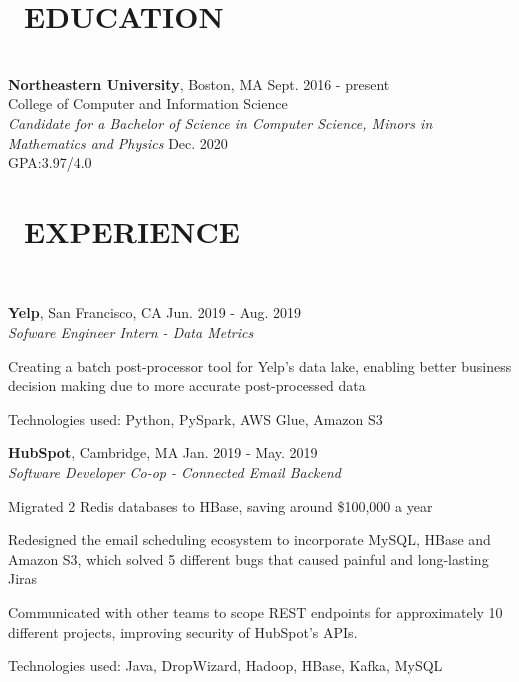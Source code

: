 \documentclass[11pt]{res}
\newcommand{\sectionunderline}{\vspace{-3mm}\hrulefill\\}
\newcommand{\listingtab}{\tabto{3.5cm}}
\newcommand{\newsect}[1]{\section{\Large \bf #1}}
\newcommand{\email}[1]{\faEnvelope\hspace{1mm} \href{mailto:#1}{#1}}
\newcommand{\phone}[1]{\faMobilePhone\hspace{1mm} #1}
\newcommand{\github}[1]{\faGithubAlt\hspace{1mm} \href{https://github.com/#1}{#1}}
\newcommand{\linkedin}[1]{\faLinkedinSquare\hspace{1mm} \href{https://linkedin.com/in/#1}{#1}}
\begin{document}
\address{
  \large\phone{(802) 503-5089}\:
  \large{$\bullet$}
  \large\email{derekpham67@gmail.com}\:
  \large{$\bullet$}
  \large\github{derekpham}\:
  \large{$\bullet$}
  \large\linkedin{derek-pham97}\\
  \normalsize Availability for internships/co-ops: Jan. - Aug. 2020
}

\begin{resume}
  \newsect{\faGraduationCap\ EDUCATION}{
    \sectionunderline{
      {\bf Northeastern University}, Boston, MA \hfill Sept. 2016 - present\\
      College of Computer and Information Science}\\
                     {\it Candidate for a Bachelor of Science in Computer Science, Minors in Mathematics and Physics} \hfill Dec. 2020
                     \vspace{2mm}\\
                     GPA:\listingtab 3.97/4.0
  }

  \newsect{\faUsers\ EXPERIENCE}{
    \sectionunderline{
      {\bf Yelp}, San Francisco, CA \hfill Jun. 2019 - Aug. 2019\\
      {\it Sofware Engineer Intern - Data Metrics}
      \begin{itemize}
        {\item Creating a batch post-processor tool for Yelp's data lake, enabling better business decision making due to more accurate post-processed data}
        {\item Technologies used: Python, PySpark, AWS Glue, Amazon S3}
      \end{itemize}

      {\bf HubSpot}, Cambridge, MA \hfill Jan. 2019 - May. 2019\\
      {\it Software Developer Co-op - Connected Email Backend}
      \begin{itemize}
        {\item Migrated 2 Redis databases to HBase, saving around \$100,000 a year}
        {\item Redesigned the email scheduling ecosystem to incorporate  MySQL, HBase and Amazon S3, which solved 5 different bugs that caused painful and long-lasting Jiras}
        {\item Communicated with other teams to scope REST endpoints for approximately 10 different projects, improving security of HubSpot's APIs.}
        {\item Technologies used: Java, DropWizard, Hadoop, HBase, Kafka, MySQL}
      \end{itemize}

}}
\end{resume}
\end{document}
